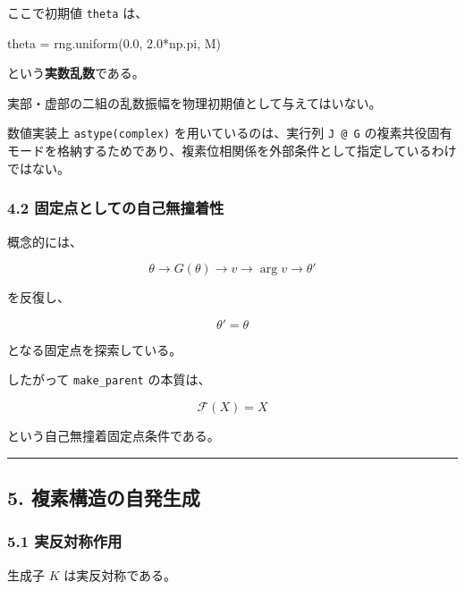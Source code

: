 \documentclass[
  a4paper,
]{ltjsarticle}
\newenvironment{Shaded}{}{}
\newcommand{\FloatTok}[1]{\textcolor[rgb]{0.25,0.63,0.44}{#1}}
\newcommand{\NormalTok}[1]{#1}
\newcommand{\OperatorTok}[1]{\textcolor[rgb]{0.40,0.40,0.40}{#1}}
\begin{document}
ここで初期値 \texttt{theta} は、

\begin{Shaded}
\begin{Highlighting}[]
\NormalTok{theta }\OperatorTok{=}\NormalTok{ rng.uniform(}\FloatTok{0.0}\NormalTok{, }\FloatTok{2.0}\OperatorTok{*}\NormalTok{np.pi, M)}
\end{Highlighting}
\end{Shaded}

という\textbf{実数乱数}である。

実部・虚部の二組の乱数振幅を物理初期値として与えてはいない。

数値実装上 \texttt{astype(complex)} を用いているのは、実行列
\texttt{J\ @\ G}
の複素共役固有モードを格納するためであり、複素位相関係を外部条件として指定しているわけではない。

\subsubsection{4.2
固定点としての自己無撞着性}\label{ux56faux5b9aux70b9ux3068ux3057ux3066ux306eux81eaux5df1ux7121ux649eux7740ux6027}

概念的には、

\[
\theta
\rightarrow
G(\theta)
\rightarrow
v
\rightarrow
\arg v
\rightarrow
\theta'
\]

を反復し、

\[
\boxed{\theta'=\theta}
\]

となる固定点を探索している。

したがって \texttt{make\_parent} の本質は、

\[
\boxed{\mathcal F(X)=X}
\]

という自己無撞着固定点条件である。

\begin{center}\rule{0.5\linewidth}{0.5pt}\end{center}

\subsection{5.
複素構造の自発生成}\label{ux8907ux7d20ux69cbux9020ux306eux81eaux767aux751fux6210}

\subsubsection{5.1
実反対称作用}\label{ux5b9fux53cdux5bfeux79f0ux4f5cux7528}

生成子 \(K\) は実反対称である。
\end{document}
